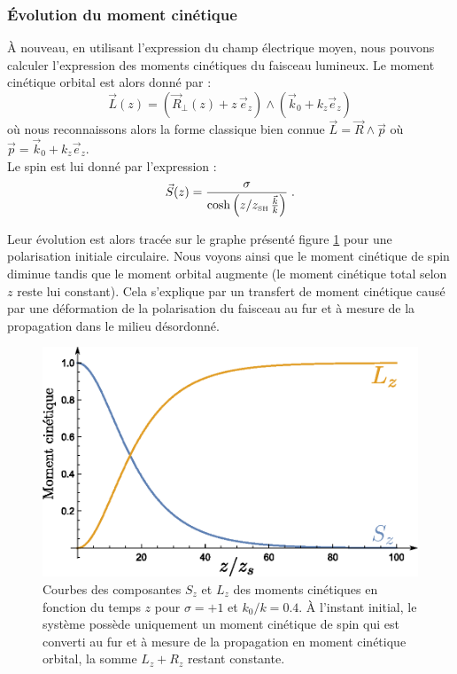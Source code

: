 \documentclass[a4paper,11pt]{article} %
\begin{document}
	\subsubsection{\'Evolution du moment cinétique}
	\`A nouveau, en utilisant l'expression du champ électrique moyen, nous pouvons calculer l'expression des moments cinétiques du faisceau lumineux. Le moment cinétique orbital est alors donné par :
	\begin{equation*}
		\label{exp_L(z)}
		\vec{L}(z) = \left(\vec{R}_\perp(z) + z \, \vec{e}_z \right) \wedge ( \vec{k}_0 + k_z \vec{e}_z ) 
	\end{equation*}
	où nous reconnaissons alors la forme classique bien connue $ \vec{L} = \vec{R} \wedge \vec{p} $ où $ \vec{p} = \vec{k}_0 + k_z \vec{e}_z $.\\
	
	Le spin est lui donné par l'expression :
	\begin{equation}
		\label{exp_S(z)}
		\vec{S}(z) =  \frac{ \sigma}{ \cosh \left( z/z_\text{{\tiny SH}} \, \frac{\vec{k}}{k} \right) } \; .
	\end{equation}
	
	Leur évolution est alors tracée sur le graphe présenté figure \ref{fig:conversion_moment_cinetique} pour une polarisation initiale circulaire. Nous voyons ainsi que le moment cinétique de spin diminue tandis que le moment orbital augmente (le moment cinétique total selon $ z $ reste lui constant). Cela s'explique par un transfert de moment cinétique causé par une déformation de la polarisation du faisceau au fur et à mesure de la propagation dans le milieu désordonné.
	
	\begin{figure}[h]
		\centering
		\begin{minipage}[c]{0.85\linewidth}
			\centering
			\includegraphics[width=0.7\linewidth]{./Illustrations/Plot_conversion_L-S.eps}
			\caption{Courbes des composantes $ S_z $ et $ L_z $ des moments cinétiques en fonction du temps $ z $ pour $ \sigma = + 1 $ et $ k_0 / k = 0.4 $. \`{A} l'instant initial, le système possède uniquement un moment cinétique de spin qui est converti au fur et à mesure de la propagation en moment cinétique orbital, la somme $ L_z + R_z $ restant constante.}
			\label{fig:conversion_moment_cinetique}
		\end{minipage}
	\end{figure}
	
\end{document}
